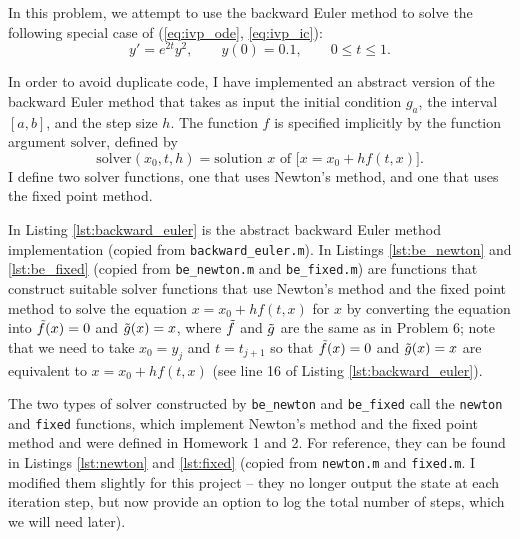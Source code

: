 \documentclass{homework}
\begin{document}
	\question
	In this problem, we attempt to use the backward Euler method to solve the following special case of (\ref{eq:ivp_ode}, \ref{eq:ivp_ic}):
	\begin{equation}
		\label{eq:p6:ode}
		y' = e^{2t}y^2, \qquad y(0) = 0.1, \qquad 0\le t\le 1.
	\end{equation}
	\begin{alphaparts}
		\questionpart
		\newcommand{\solver}{\mathrm{solver}}
		In order to avoid duplicate code, I have implemented an abstract version of the backward Euler method that takes as input the initial condition $g_a$, the interval $[a,b]$, and the step size $h$. The function $f$ is specified implicitly by the function argument $\solver$, defined by
		\begin{equation}
			\solver(x_0, t, h) = \text{solution $x$ of } \big[x = x_0 + hf(t,x)\big].
		\end{equation}
		I define two solver functions, one that uses Newton's method, and one that uses the fixed point method. 
		
		In Listing \ref{lst:backward_euler} is the abstract backward Euler method implementation (copied from \verb*|backward_euler.m|). In Listings \ref{lst:be_newton} and \ref{lst:be_fixed} (copied from \verb*|be_newton.m| and \verb*|be_fixed.m|) are functions that construct suitable $\solver$ functions that use Newton's method and the fixed point method to solve the equation $x = x_0 + hf(t,x)$ for $x$ by converting the equation into $\tilde{f}(x) = 0$ and $\tilde{g}(x) = x$, where $\tilde{f}$ and $\tilde{g}$ are the same as in Problem 6; note that we need to take $x_0 = y_j$ and $t = t_{j+1}$ so that $\tilde{f}(x) = 0$ and $\tilde{g}(x) = x$ are equivalent to $x = x_0 + hf(t,x)$ (see line 16 of Listing \ref{lst:backward_euler}).
		
		
		
		
		
		
		
		The two types of $\solver$ constructed by \verb*|be_newton| and \verb*|be_fixed| call the \verb*|newton| and \verb*|fixed| functions, which implement Newton's method and the fixed point method and were defined in Homework 1 and 2. For reference, they can be found in Listings \ref{lst:newton} and \ref{lst:fixed} (copied from \verb*|newton.m| and \verb*|fixed.m|. I modified them slightly for this project -- they no longer output the state at each iteration step, but now provide an option to log the total number of steps, which we will need later).
		

\end{alphaparts}
\end{document}
